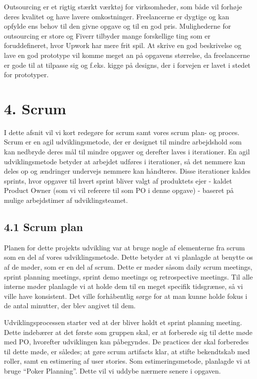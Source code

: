 \documentclass[11pt]{report}
\begin{document}
Outsourcing er et rigtig stærkt værktøj for virksomheder, som både vil forhøje deres kvalitet og have lavere omkostninger. Freelancerne er dygtige og kan opfylde ens behov til  den givne opgave og til en  god pris. Mulighederne for outsourcing er store og Fiverr tilbyder mange forskellige ting som er foruddefineret, hvor Upwork har mere frit spil. At skrive en god beskrivelse og lave en god prototype vil komme meget an på opgavens størrelse, da freelancerne er gode til at tilpasse sig og f.eks. kigge på designs, der i forvejen er lavet i stedet for prototyper.

\chapter*{4. Scrum}
I dette afsnit vil vi kort redegøre for scrum samt vores scrum plan- og proces. Scrum er en agil udviklingsmetode, der er designet til mindre arbejdshold som kan nedbryde deres mål til mindre opgaver og derefter laves i iterationer. En agil udviklingsmetode betyder at arbejdet udføres i iterationer, så det nemmere kan deles op og ændringer undervejs nemmere kan håndteres. Disse iterationer kaldes sprints, hvor opgaver til hvert sprint bliver valgt af produktets ejer - kaldet Product Owner (som vi vil referere til som PO i denne opgave) - baseret på mulige arbejdstimer af udviklingsteamet.

\section*{4.1 Scrum plan}
Planen for dette projekts udvikling var at bruge nogle af elementerne fra scrum som en del af vores udviklingsmetode. Dette betyder at vi planlagde at benytte os af de møder, som er en del af scrum. Dette er møder såsom daily scrum meetings, sprint planning meetings, sprint demo meetings og retrospective meetings. Til alle interne møder planlagde vi at holde dem til en meget specifik tidsgrænse, så vi ville have konsistent. Det ville forhåbentlig sørge for at man kunne holde fokus i de antal minutter, der blev angivet til dem.

Udviklingsprocessen starter ved at der bliver holdt et sprint planning meeting. Dette indebærer at det første som gruppen skal, er at forberede sig til dette møde med PO, hvorefter udviklingen kan påbegyndes. De practices der skal forberedes til dette møde, er således; at gøre scrum artifacts klar, at stifte bekendtskab med roller, samt en estimering af user stories. Som estimeringsmetode, planlagde vi at bruge “Poker Planning”. Dette vil vi uddybe nærmere senere i opgaven.
\end{document}
